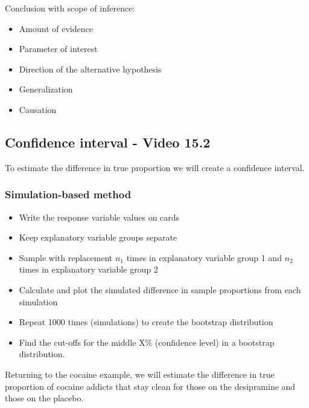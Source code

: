 \documentclass[
]{report}
\begin{document}
\vspace{0.8in}

Conclusion with scope of inference:

\begin{itemize}
\item
  Amount of evidence
\item
  Parameter of interest
\item
  Direction of the alternative hypothesis
\item
  Generalization
\item
  Causation
\end{itemize}

\vspace{0.8in}

\newpage

\subsection*{Confidence interval - Video 15.2}\label{confidence-interval---video-15.2}

To estimate the difference in true proportion we will create a confidence interval.

\subsubsection*{Simulation-based method}\label{simulation-based-method-1}

\begin{itemize}
\item
  Write the response variable values on cards
\item
  Keep explanatory variable groups separate
\item
  Sample with replacement \(n_1\) times in explanatory variable group 1 and \(n_2\) times in explanatory variable group 2
\item
  Calculate and plot the simulated difference in sample proportions from each simulation
\item
  Repeat 1000 times (simulations) to create the bootstrap distribution
\item
  Find the cut-offs for the middle X\% (confidence level) in a bootstrap distribution.
\end{itemize}

Returning to the cocaine example, we will estimate the difference in true proportion of cocaine addicts that stay clean for those on the desipramine and those on the placebo.
\end{document}
